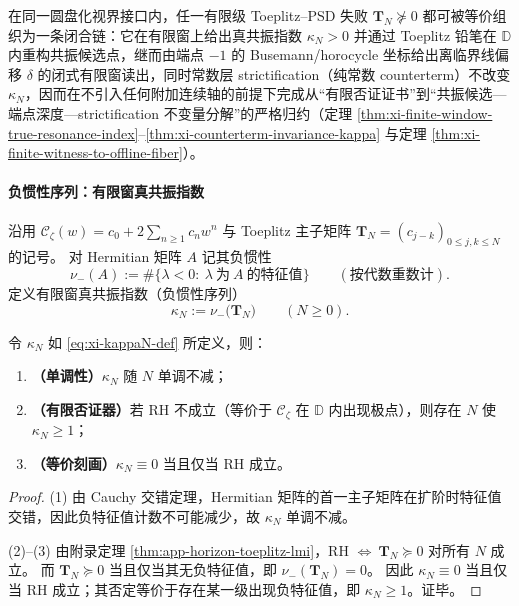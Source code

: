 

\begin{theorem}\label{thm:xi-toeplitz-failure-closed-chain}
在同一圆盘化视界接口内，任一有限级 Toeplitz--PSD 失败 \(\mathbf{T}_N\nsucceq 0\) 都可被等价组织为一条闭合链：它在有限窗上给出真共振指数 \(\kappa_N>0\) 并通过 Toeplitz 铅笔在 \(\mathbb{D}\) 内重构共振候选点，继而由端点 \(-1\) 的 Busemann/horocycle 坐标给出离临界线偏移 \(\delta\) 的闭式有限窗读出，同时常数层 strictification（纯常数 counterterm）不改变 \(\kappa_N\)，因而在不引入任何附加连续轴的前提下完成从“有限否证证书”到“共振候选—端点深度—strictification 不变量分解”的严格归约（定理 \ref{thm:xi-finite-window-true-resonance-index}--\ref{thm:xi-counterterm-invariance-kappa} 与定理 \ref{thm:xi-finite-witness-to-offline-fiber}）。
\end{theorem}

\paragraph{负惯性序列：有限窗真共振指数}
沿用 \(\mathscr{C}_{\zeta}(w)=c_0+2\sum_{n\ge 1}c_n w^n\) 与 Toeplitz 主子矩阵 \(\mathbf{T}_N=(c_{j-k})_{0\le j,k\le N}\) 的记号。
对 Hermitian 矩阵 \(A\) 记其负惯性
\[
\nu_-(A):=\#\{\lambda<0:\ \lambda\ \text{为}\ A\ \text{的特征值}\}\qquad(\text{按代数重数计}).
\]
定义有限窗真共振指数（负惯性序列）
\begin{equation}\label{eq:xi-kappaN-def}
\boxed{\ \kappa_N:=\nu_-\!\bigl(\mathbf{T}_N\bigr)\qquad(N\ge 0).\ }
\end{equation}

\begin{theorem}\label{thm:xi-finite-window-true-resonance-index}
令 \(\kappa_N\) 如 \eqref{eq:xi-kappaN-def} 所定义，则：
\begin{enumerate}
  \item \textbf{（单调性）}\(\kappa_N\) 随 \(N\) 单调不减；
  \item \textbf{（有限否证器）}若 RH 不成立（等价于 \(\mathscr{C}_{\zeta}\) 在 \(\mathbb{D}\) 内出现极点），则存在 \(N\) 使 \(\kappa_N\ge 1\)；
  \item \textbf{（等价刻画）}\(\kappa_N\equiv 0\) 当且仅当 RH 成立。
\end{enumerate}
\end{theorem}

\begin{proof}
(1) 由 Cauchy 交错定理，Hermitian 矩阵的首一主子矩阵在扩阶时特征值交错，因此负特征值计数不可能减少，故 \(\kappa_N\) 单调不减。
\par
(2)--(3) 由附录定理 \ref{thm:app-horizon-toeplitz-lmi}，RH \(\Longleftrightarrow\ \mathbf{T}_N\succeq 0\) 对所有 \(N\) 成立。
而 \(\mathbf{T}_N\succeq 0\) 当且仅当其无负特征值，即 \(\nu_-(\mathbf{T}_N)=0\)。
因此 \(\kappa_N\equiv 0\) 当且仅当 RH 成立；其否定等价于存在某一级出现负特征值，即 \(\kappa_N\ge 1\)。证毕。
\end{proof}

